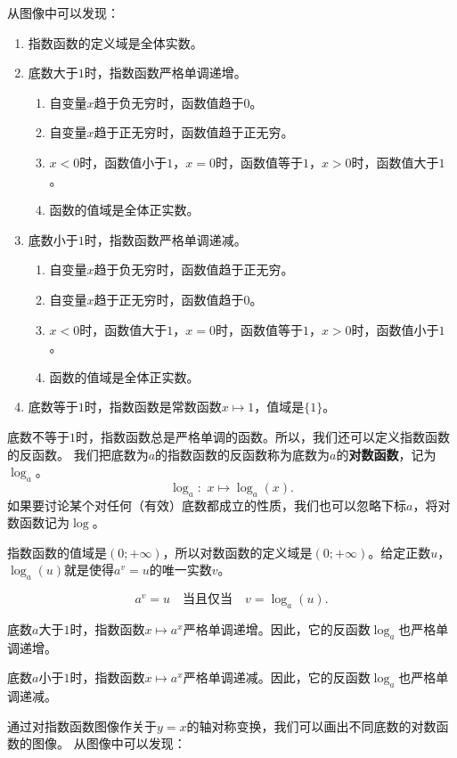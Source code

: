 \documentclass[12pt,UTF8]{ctexbook}
\begin{document}
从图像中可以发现：
\begin{enumerate}
    \item 指数函数的定义域是全体实数。
    \item 底数大于$1$时，指数函数严格单调递增。
    \begin{enumerate}[label*=\arabic*.]
        \item 自变量$x$趋于负无穷时，函数值趋于$0$。
        \item 自变量$x$趋于正无穷时，函数值趋于正无穷。
        \item $x < 0$时，函数值小于$1$，$x = 0$时，函数值等于$1$，$x > 0$时，函数值大于$1$。
        \item 函数的值域是全体正实数。
    \end{enumerate}
    \item 底数小于$1$时，指数函数严格单调递减。    
    \begin{enumerate}[label*=\arabic*.]
        \item 自变量$x$趋于负无穷时，函数值趋于正无穷。
        \item 自变量$x$趋于正无穷时，函数值趋于$0$。
        \item $x < 0$时，函数值大于$1$，$x = 0$时，函数值等于$1$，$x > 0$时，函数值小于$1$。
        \item 函数的值域是全体正实数。
    \end{enumerate}
    \item 底数等于$1$时，指数函数是常数函数$x \mapsto 1$，值域是$\{1\}$。
\end{enumerate}

底数不等于$1$时，指数函数总是严格单调的函数。所以，我们还可以定义指数函数的反函数。
我们把底数为$a$的指数函数的反函数称为底数为$a$的\textbf{对数函数}，记为$\log_a$。
$$ \log_a : \,\, x \mapsto \log_a(x). $$
如果要讨论某个对任何（有效）底数都成立的性质，我们也可以忽略下标$a$，将对数函数记为$\log$。

指数函数的值域是$(0;+\infty)$，所以对数函数的定义域是$(0;+\infty)$。给定正数$u$，$\log_a(u)$就是使得$a^v = u$的唯一实数$v$。

$$ a^v = u \quad\mbox{当且仅当} \quad v = \log_a(u). $$

底数$a$大于$1$时，指数函数$x\mapsto a^x$严格单调递增。因此，它的反函数$\log_a$也严格单调递增。

底数$a$小于$1$时，指数函数$x\mapsto a^x$严格单调递减。因此，它的反函数$\log_a$也严格单调递减。

通过对指数函数图像作关于$y = x$的轴对称变换，我们可以画出不同底数的对数函数的图像。
从图像中可以发现：
\end{document}
